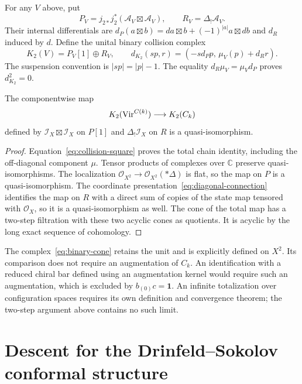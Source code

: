 For any $V$ above, put
\[
 P_V=j_{2*}j_2^*(\mathcal A_V\boxtimes\mathcal A_V),
 \qquad R_V=\Delta_!\mathcal A_V.
\]
Their internal differentials are $d_P(a\boxtimes b)=da\boxtimes b+(-1)^{|a|}a\boxtimes db$ and $d_R$ induced by $d$.
Define the unital binary collision complex
\begin{equation}\label{eq:binary-cone}
 K_2(V)=P_V[1]\oplus R_V,
 \qquad d_{K_2}(sp,r)=(-s d_Pp,\,\mu_V(p)+d_Rr).
\end{equation}
The suspension convention is $|sp|=|p|-1$.
The equality $d_R\mu_V=\mu_Vd_P$ proves $d_{K_2}^2=0$.

\begin{corollary}\label{cor:binary-quasi}
The componentwise map
\[
 K_2(\operatorname{Vir}^{C(k)})\longrightarrow K_2(C_k)
\]
defined by $\mathcal I_X\boxtimes\mathcal I_X$ on $P[1]$ and $\Delta_!\mathcal I_X$ on $R$ is a quasi-isomorphism.
\end{corollary}
\begin{proof}
Equation~\eqref{eq:collision-square} proves the total chain identity, including the off-diagonal component $\mu$.
Tensor products of complexes over $\mathbb C$ preserve quasi-isomorphisms.
The localization $\mathcal O_{X^2}\to\mathcal O_{X^2}(*\Delta)$ is flat, so the map on $P$ is a quasi-isomorphism.
The coordinate presentation~\eqref{eq:diagonal-connection} identifies the map on $R$ with a direct sum of copies of the state map tensored with $\mathcal O_X$, so it is a quasi-isomorphism as well.
The cone of the total map has a two-step filtration with these two acyclic cones as quotients.
It is acyclic by the long exact sequence of cohomology.
\end{proof}

The complex~\eqref{eq:binary-cone} retains the unit and is explicitly defined on $X^2$.
Its comparison does not require an augmentation of $C_k$.
An identification with a reduced chiral bar defined using an augmentation kernel would require such an augmentation, which is excluded by $b_{(0)}c=\mathbf1$.
An infinite totalization over configuration spaces requires its own definition and convergence theorem; the two-step argument above contains no such limit.

\section{Descent for the Drinfeld--Sokolov conformal structure}

